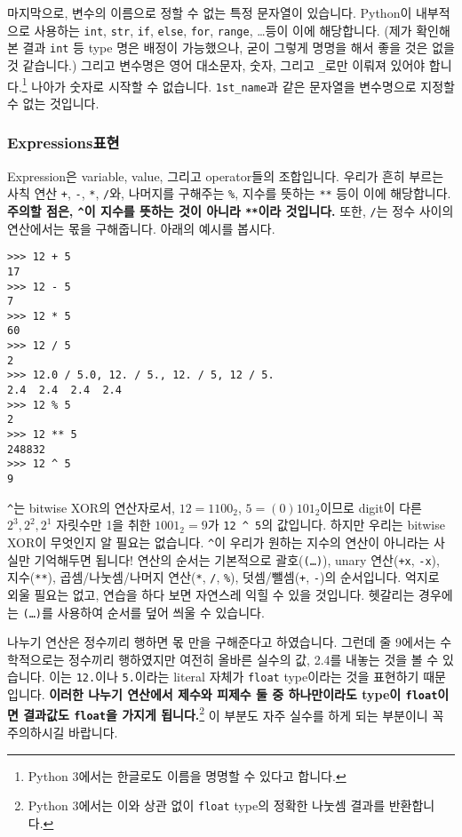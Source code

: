 \documentclass[../main.tex]{subfiles}
\begin{document}
마지막으로, 변수의 이름으로 정할 수 없는 특정 문자열이 있습니다.
Python이 내부적으로 사용하는 \texttt{int}, \texttt{str}, \texttt{if}, \texttt{else}, \texttt{for}, \texttt{range}, \dots 등이 이에 해당합니다.
(제가 확인해본 결과 \texttt{int} 등 type 명은 배정이 가능했으나, 굳이 그렇게 명명을 해서 좋을 것은 없을 것 같습니다.)
그리고 변수명은 영어 대소문자, 숫자, 그리고 \texttt{\_}로만 이뤄져 있어야 합니다.\footnote{Python 3에서는 한글로도 이름을 명명할 수 있다고 합니다.}
나아가 숫자로 시작할 수 없습니다.
\texttt{1st\_name}과 같은 문자열을 변수명으로 지정할 수 없는 것입니다.

\subsubsection{Expressions표현}
Expression은 variable, value, 그리고 operator들의 조합입니다.
우리가 흔히 부르는 사칙 연산 \texttt{+}, \texttt{-}, \texttt{*}, \texttt{/}와, 나머지를 구해주는 \texttt{\%}, 지수를 뜻하는 \texttt{**} 등이 이에 해당합니다.
\textbf{주의할 점은, \texttt{\^{}}이 지수를 뜻하는 것이 아니라 \texttt{**}이라 것입니다.}
또한, \texttt{/}는 정수 사이의 연산에서는 몫을 구해줍니다.
아래의 예시를 봅시다.
\begin{verbatim}
>>> 12 + 5
17
>>> 12 - 5
7
>>> 12 * 5
60
>>> 12 / 5
2
>>> 12.0 / 5.0, 12. / 5., 12. / 5, 12 / 5.
2.4  2.4  2.4  2.4
>>> 12 % 5
2
>>> 12 ** 5
248832
>>> 12 ^ 5
9
\end{verbatim}
\texttt{\^{}}는 bitwise XOR의 연산자로서, $12 = 1100_2$, $5 = (0)101_2$이므로 digit이 다른 $2^3, 2^2, 2^1$ 자릿수만 1을 취한 $1001_2 = 9$가 \texttt{12 \^{} 5}의 값입니다.
하지만 우리는 bitwise XOR이 무엇인지 알 필요는 없습니다.
\texttt{\^{}}이 우리가 원하는 지수의 연산이 아니라는 사실만 기억해두면 됩니다!
연산의 순서는 기본적으로 괄호(\texttt{(\dots)}), unary 연산(\texttt{+x}, \texttt{-x}), 지수(\texttt{**}), 곱셈/나눗셈/나머지 연산(\texttt{*}, \texttt{/}, \texttt{\%}), 덧셈/뺄셈(\texttt{+}, \texttt{-})의 순서입니다.
억지로 외울 필요는 없고, 연습을 하다 보면 자연스레 익힐 수 있을 것입니다.
헷갈리는 경우에는 \texttt{(\dots)}를 사용하여 순서를 덮어 씌울 수 있습니다.

나누기 연산은 정수끼리 행하면 몫 만을 구해준다고 하였습니다.
그런데 줄 9에서는 수학적으로는 정수끼리 행하였지만 여전히 올바른 실수의 값, 2.4를 내놓는 것을 볼 수 있습니다.
이는 \texttt{12.}이나 \texttt{5.}이라는 literal 자체가 \texttt{float} type이라는 것을 표현하기 때문입니다.
\textbf{이러한 나누기 연산에서 제수와 피제수 둘 중 하나만이라도 type이 \texttt{float}이면 결과값도 \texttt{float}을 가지게 됩니다.}\footnote{Python 3에서는 이와 상관 없이 \texttt{float} type의 정확한 나눗셈 결과를 반환합니다.}
이 부분도 자주 실수를 하게 되는 부분이니 꼭 주의하시길 바랍니다.
\end{document}
